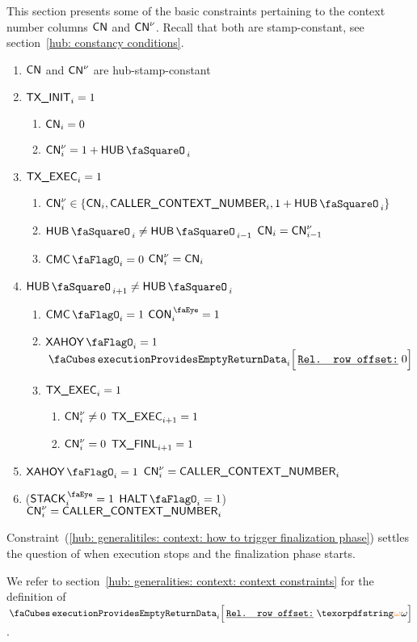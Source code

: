 This section presents some of the basic constraints pertaining to the context number columns $\textsf{CN}$ and $\textsf{CN}^{\nu}$.
Recall that both are stamp-constant, see section~\ref{hub: constancy conditions}.
\begin{enumerate}
	\item $\textsf{CN}$ and $\textsf{CN}^{\nu}$ are hub-stamp-constant
	\item \If $\textsf{TX}\textsf{\_INIT}_{i} = 1$ \Then
		\begin{enumerate}
			\item $\textsf{CN}     _{i} = 0$
			\item $\cn\new _{i} = 1 + \hubStamp_{i}$
		\end{enumerate}
	\item \If $\textsf{TX}\textsf{\_EXEC}_{i} = 1$ \Then 
		\begin{enumerate}
			\item\label{next context number}
				$\cn\new_{i} \in \{ \cn_{i}, \caller_{i}, 1 + \hubStamp_{i} \}$
			\item \If $\hubStamp_{i} \neq \hubStamp_{i - 1}$ \Then $\textsf{CN}_{i} = \textsf{CN}^{\nu}_{i - 1}$
			\item \If $\cmc_{i} = 0$ \Then $\textsf{CN}^{\nu}_{i} = \textsf{CN}_{i}$
		\end{enumerate}
	\item \If $\hubStamp_{i + 1} \neq \hubStamp_{i}$ \Then
		\begin{enumerate}
			\item \If $\cmc_{i}    = 1$ \Then $\peekContext_{i} = 1$
			\item \If $\xAhoy_{i}  = 1$ \Then $\executionProvidesEmptyReturnData {i}{0} $
			\item\label{hub: generalitiles: context: how to trigger finalization phase} \If $\textsf{TX}\textsf{\_EXEC}_{i} = 1$
				\begin{enumerate}
				        \item \If $\textsf{CN}^{\nu}_{i} \neq 0$ \Then $\textsf{TX}\textsf{\_EXEC}_{i + 1} = 1$
				        \item \If $\textsf{CN}^{\nu}_{i} =    0$ \Then $\textsf{TX}\textsf{\_FINL}_{i + 1} = 1$
				\end{enumerate}
		\end{enumerate}
	\item \If $\xAhoy_{i} = 1$ \Then $\textsf{CN}^{\nu}_{i} = \textsf{CALLER\_CONTEXT\_NUMBER}_{i}$
	\item \If \big($\peekStack_{i} = 1$ \et $\haltFlag_{i} = 1$\big) \Then $\textsf{CN}^{\nu}_{i} = \textsf{CALLER\_CONTEXT\_NUMBER}_{i}$
\end{enumerate}
\saNote{} Constraint~(\ref{hub: generalitiles: context: how to trigger finalization phase}) settles the question of when execution stops and the finalization phase starts.

\saNote{} We refer to section~\ref{hub: generalities: context: context constraints} for the definition of $\executionProvidesEmptyReturnData {i}{\relof}$.

